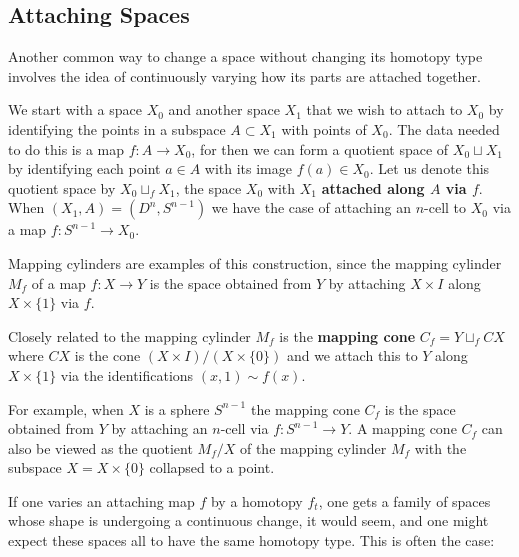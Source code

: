 \subsection*{Attaching Spaces}

Another common way to change a space without changing its homotopy type
involves the idea of continuously varying how its parts are attached together.

\begin{definition}
\label{def:attaching-space}
\leanok
We start with a space $X_0$ and another space $X_1$ that we wish to attach to $X_0$
by identifying the points in a subspace $A \subset X_1$ with points of $X_0$. The data
needed to do this is a map $f : A \to X_0$, for then we can form a quotient space of
$X_0 \sqcup X_1$ by identifying each point $a \in A$ with its image $f(a) \in X_0$. Let us
denote this quotient space by $X_0 \sqcup_f X_1$, the space $X_0$ with $X_1$
\textbf{attached along $A$ via $f$}. When $(X_1,A) = (D^n, S^{n-1})$ we have the case of
attaching an $n$-cell to $X_0$ via a map $f : S^{n-1} \to X_0$.
\end{definition}

Mapping cylinders are examples of this construction, since the mapping cylinder
$M_f$ of a map $f : X \to Y$ is the space obtained from $Y$ by attaching $X \times I$ along
$X \times \{1\}$ via $f$.

\begin{definition}
\label{def:mapping-cone}
Closely related to the mapping cylinder $M_f$ is the \textbf{mapping cone}
$C_f = Y \sqcup_f CX$ where $CX$ is the cone $(X \times I)/(X \times \{0\})$ and we attach this
to $Y$ along $X \times \{1\}$ via the identifications $(x,1) \sim f(x)$.
\end{definition}

For example, when $X$ is a sphere $S^{n-1}$ the mapping cone $C_f$ is the space
obtained from $Y$ by attaching an $n$-cell via $f : S^{n-1} \to Y$. A mapping cone $C_f$
can also be viewed as the quotient $M_f/X$ of the mapping cylinder $M_f$ with the
subspace $X = X \times \{0\}$ collapsed to a point.



If one varies an attaching map $f$ by a homotopy $f_t$, one gets a family of spaces
whose shape is undergoing a continuous change, it would seem, and one might expect
these spaces all to have the same homotopy type. This is often the case:

